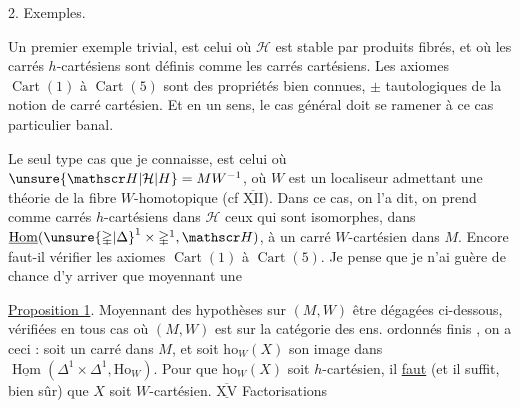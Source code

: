 2. Exemples.

Un premier exemple trivial, est celui où $\mathscr H$ est stable par produits fibrés, et où les carrés $h$-cartésiens sont définis comme les carrés cartésiens. Les axiomes $\operatorname{Cart}(1)$ à $\operatorname{Cart}(5)$ sont des propriétés bien connues, $\pm$ tautologiques de la notion de carré cartésien. Et
en un sens, le cas général doit se ramener à ce cas particulier banal.

Le seul type  cas que je connaisse, est celui où $\unsure{\mathscr H|\mathcal H|H}=MW^{-1}$, où $W$ est un localiseur admettant une théorie de la fibre $W$-homotopique (cf $\underline{\overline{\mathrm{XII}}}$). Dans ce cas, on l'a dit, on prend comme carrés $h$-cartésiens dans $\mathscr H$ ceux qui sont isomorphes, dans $\underline{\operatorname{Hom}}(\unsure{\mathbb{\Delta}|\Delta}^{1}\times\mathbb{\Delta}^{1},\mathscr H)$, à un carré $W$-cartésien dans $M$. Encore faut-il vérifier les axiomes $\operatorname{Cart}(1)$ à $\operatorname{Cart}(5)$. Je pense que je n'ai guère de chance d'y arriver que moyennant une

\uline{Proposition 1}. Moyennant des hypothèses sur $(M,W)$  être dégagées ci-dessous, vérifiées en tous cas où $(M,W)$ est   sur la catégorie des ens. ordonnés finis , on a ceci :
\margin{$\vert$}
soit
un carré dans $M$, et soit $\mathrm{ho}_W(X)$ son image dans $\underline{\operatorname{Hom}}(\mathbb{\Delta}^{1}\times\mathbb{\Delta}^{1},\mathrm{Ho}_W)$.
\margin{$\vert$}
Pour que $\mathrm{ho}_W(X)$ soit $h$-cartésien, il \uline{faut} (et il suffit, bien sûr) que $X$ soit $W$-cartésien.
$\underline{\overline{\mathrm{XV}}}$ Factorisations

